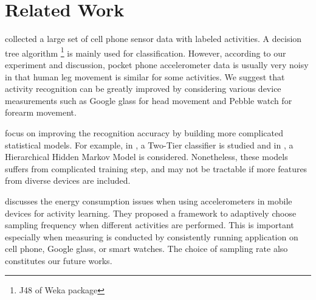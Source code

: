 
\section{Related Work}
\label{sec:related-work}

\cite{kwapisz2011activity} collected a large set of cell phone sensor data with labeled activities. A decision tree algorithm \footnote{J48 of Weka package} is mainly used for classification. However, according to our experiment and discussion, pocket phone accelerometer data is usually very noisy in that human leg movement is similar for some activities. We suggest that activity recognition can be greatly improved by considering various device measurements such as Google glass for head movement and Pebble watch for forearm movement.

\cite{srinivasan2012accurate,lee2011activity} focus on improving the recognition accuracy by building more complicated statistical models. For example, in \cite{srinivasan2012accurate}, a Two-Tier classifier is studied and in \cite{lee2011activity}, a Hierarchical Hidden Markov Model is considered. Nonetheless, these models suffers from complicated training step, and may not be tractable if more features from diverse devices are included. 

\cite{yan2012energy} discusses the energy consumption issues when using accelerometers in mobile devices for activity learning. They proposed a framework to adaptively choose sampling frequency when different activities are performed. This is important especially when measuring is conducted by consistently running application on cell phone, Google glass, or smart watches. The choice of sampling rate also constitutes our future works. 

 
